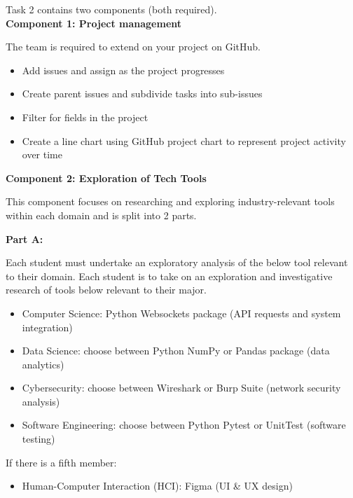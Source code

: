 \documentclass[a4paper, 11pt]{report}
\begin{document}
Task 2 contains two components (both required).\\[2mm]

\textbf{Component 1: Project management}

The team is required to extend on your project on GitHub.

\begin{itemize}
    \item Add issues and assign as the project progresses
    \item Create parent issues and subdivide tasks into sub-issues
    \item Filter for fields in the project
    \item Create a line chart using GitHub project chart to represent project activity over time
\end{itemize} 

\vspace{4ex}

\textbf{Component 2: Exploration of Tech Tools}

This component focuses on researching and exploring industry-relevant tools within each domain and is split into 2 parts.

\vspace{2ex}


\textbf{Part A:}

Each student must undertake an exploratory analysis of the below tool relevant to their domain. 
Each student is to take on an exploration and investigative research of tools below relevant to their major. 

\begin{itemize}
    \item Computer Science: Python Websockets package (API requests and system integration)
    \item Data Science: choose between Python NumPy or Pandas package (data analytics)
    \item Cybersecurity: choose between Wireshark or Burp Suite (network security analysis)
    \item Software Engineering: choose between Python Pytest or UnitTest (software testing)
\end{itemize}
If there is a fifth member:
\begin{itemize}
    \item Human-Computer Interaction (HCI): Figma (UI \& UX design)
\end{itemize}

\vspace{4ex}
\end{document}
